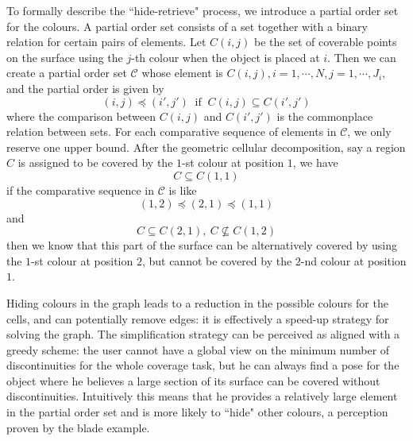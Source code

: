 \documentclass[letterpaper,journal]{IEEEtran}
\begin{document}
To formally describe the ``hide-retrieve" process, we introduce a partial order set for the colours. 
A partial order set consists of a set together with a binary relation for certain pairs of elements. 
Let $C(i, j)$ be the set of coverable points on the surface using the $j$-th colour when the object is placed at $i$. Then we can create a partial order set $\mathscr{C}$ whose element is $C(i, j), i = 1, \cdots, N, j = 1, \cdots, J_i$, and the partial order is given by 
\begin{equation}
(i, j)\preceq (i', j') ~\mbox{ if }~ C(i, j)\subseteq C(i', j')
\end{equation}
where the comparison between $C(i, j)$ and $C(i', j')$ is the commonplace relation between sets. 
For each comparative sequence of elements in $\mathscr{C}$, we only reserve one upper bound. 
After the geometric cellular decomposition, say a region $C$ is assigned to be covered by the $1$-st colour at position $1$, we have
\begin{equation}
C\subseteq C(1, 1)
\end{equation}
if the comparative sequence in $\mathscr{C}$ is like
\begin{equation}
(1, 2)\preceq (2, 1)\preceq (1, 1)
\end{equation} 
and 
\begin{equation}
C\subseteq C(2, 1),\ C\nsubseteq C(1, 2)
\end{equation}
then we know that this part of the surface can be alternatively covered by using the $1$-st colour at position $2$, but cannot be covered by the $2$-nd colour at position $1$. 

Hiding colours in the graph leads to a reduction in the possible colours for the cells, and can potentially remove edges: it is effectively a speed-up strategy for solving the graph. The simplification strategy can be perceived as aligned with a greedy scheme: the user cannot have a global view on the minimum number of discontinuities for the whole coverage task, but he can always find a pose for the object where he believes a large section of its surface can be covered without discontinuities. Intuitively this means that he provides a relatively large element in the partial order set and is more likely to ``hide" other colours, a perception proven by the blade example.
\end{document}
